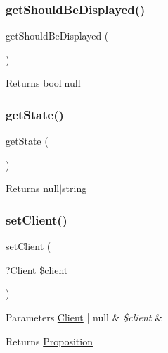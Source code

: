 \subsubsection{\texorpdfstring{getShouldBeDisplayed()}{getShouldBeDisplayed()}}
{\footnotesize\ttfamily get\+Should\+Be\+Displayed (\begin{DoxyParamCaption}{ }\end{DoxyParamCaption})}

\begin{DoxyReturn}{Returns}
bool$\vert$null 
\end{DoxyReturn}
\mbox{\label{class_app_1_1_entity_1_1_proposition_afbf787ced76807989fb3093e1772c5a1}} 
\subsubsection{\texorpdfstring{getState()}{getState()}}
{\footnotesize\ttfamily get\+State (\begin{DoxyParamCaption}{ }\end{DoxyParamCaption})}

\begin{DoxyReturn}{Returns}
null$\vert$string 
\end{DoxyReturn}
\mbox{\label{class_app_1_1_entity_1_1_proposition_a8122a5458a0e4aa14a4a16840c769a64}} 
\subsubsection{\texorpdfstring{setClient()}{setClient()}}
{\footnotesize\ttfamily set\+Client (\begin{DoxyParamCaption}\item[{?\mbox{\hyperlink{class_app_1_1_entity_1_1_client}{Client}}}]{\$client }\end{DoxyParamCaption})}


\begin{DoxyParams}[1]{Parameters}
\mbox{\hyperlink{class_app_1_1_entity_1_1_client}{Client}} | null & {\em \$client} & \\
\hline
\end{DoxyParams}
\begin{DoxyReturn}{Returns}
\mbox{\hyperlink{class_app_1_1_entity_1_1_proposition}{Proposition}} 
\end{DoxyReturn}
\mbox{\label{class_app_1_1_entity_1_1_proposition_a3f68ab62013f2aa1f33b1545136bce7e}} 
